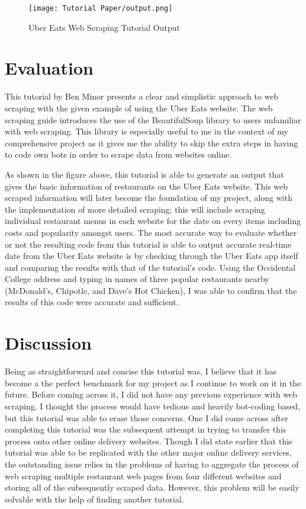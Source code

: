 \documentclass[10pt,twocolumn]{article}
\begin{document}
\begin{figure}
    \centering
    \texttt{[image: Tutorial Paper/output.png]}
    \caption{
        Uber Eats Web Scraping Tutorial Output
    }
    \label{fig:second-page}
\end{figure}

\section{Evaluation}

This tutorial by Ben Minor presents a clear and simplistic approach to web scraping with the given example of using the Uber Eats website. The web scraping guide introduces the use of the BeautifulSoup library to users unfamiliar with web scraping. This library is especially useful to me in the context of my comprehensive project as it gives me the ability to skip the extra steps in having to code own bots in order to scrape data from websites online. 

As shown in the figure above, this tutorial is able to generate an output that gives the basic information of restaurants on the Uber Eats website. This web scraped information will later become the foundation of my project, along with the implementation of more detailed scraping; this will include scraping individual restaurant menus in each website for the date on every items including costs and popularity amongst users. The most accurate way to evaluate whether or not the resulting code from this tutorial is able to output accurate real-time date from the Uber Eats website is by checking through the Uber Eats app itself and comparing the results with that of the tutorial's code. Using the Occidental College address and typing in names of three popular restaurants nearby (McDonald's, Chipotle, and Dave's Hot Chicken), I was able to confirm that the results of this code were accurate and sufficient.

\section{Discussion}

Being as straightforward and concise this tutorial was, I believe that it has become a the perfect benchmark for my project as I continue to work on it in the future. Before coming across it, I did not have any previous experience with web scraping. I thought the process would have tedious and heavily bot-coding based, but this tutorial was able to erase those concerns. One I did come across after completing this tutorial was the subsequent attempt in trying to transfer this process onto other online delivery websites. Though I did state earlier that this tutorial was able to be replicated with the other major online delivery services, the outstanding issue relies in the problems of having to aggregate the process of web scraping multiple restaurant web pages from four different websites and storing all of the subsequently scraped data. However, this problem will be easily solvable with the help of finding another tutorial.
\end{document}
